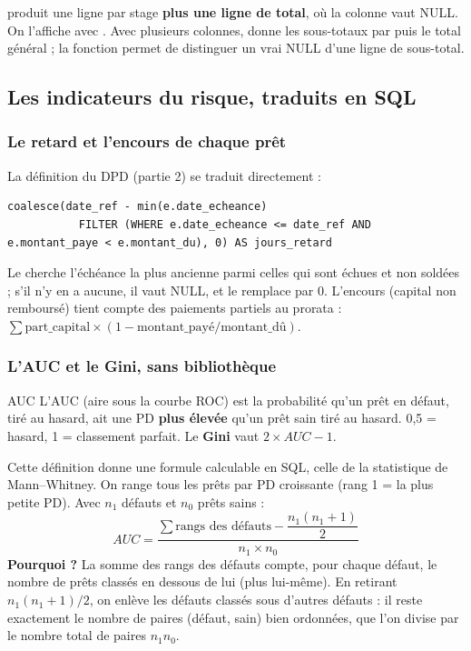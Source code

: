  produit une ligne par stage \textbf{plus une ligne de total}, où la
colonne  vaut NULL. On l'affiche avec . Avec
plusieurs colonnes,  donne les sous-totaux par  puis le total général ; la
fonction  permet de distinguer un vrai NULL d'une ligne de sous-total.

\subsection{Les indicateurs du risque, traduits en SQL}

\subsubsection{Le retard et l'encours de chaque prêt}

La définition du DPD (partie 2) se traduit directement :
\begin{lstlisting}[style=sql]
coalesce(date_ref - min(e.date_echeance)
           FILTER (WHERE e.date_echeance <= date_ref AND e.montant_paye < e.montant_du), 0) AS jours_retard
\end{lstlisting}
Le  cherche l'échéance la plus ancienne parmi celles qui sont échues et non soldées ; s'il
n'y en a aucune, il vaut NULL, et  le remplace par 0. L'encours (capital non remboursé)
tient compte des paiements partiels au prorata :
$\sum \text{part\_capital} \times (1 - \text{montant\_payé} / \text{montant\_dû})$.

\subsubsection{L'AUC et le Gini, sans bibliothèque}

\begin{definition}{AUC}
L'AUC (aire sous la courbe ROC) est la probabilité qu'un prêt en défaut, tiré au hasard, ait une PD
\textbf{plus élevée} qu'un prêt sain tiré au hasard. 0,5 = hasard, 1 = classement parfait. Le
\textbf{Gini} vaut $2 \times AUC - 1$.
\end{definition}

Cette définition donne une formule calculable en SQL, celle de la statistique de Mann--Whitney. On
range tous les prêts par PD croissante (rang 1 = la plus petite PD). Avec $n_1$ défauts et $n_0$ prêts
sains :
\[
\boxed{\;AUC = \frac{\sum \text{rangs des défauts} - \dfrac{n_1(n_1+1)}{2}}{n_1 \times n_0}\;}
\]
\textbf{Pourquoi ?} La somme des rangs des défauts compte, pour chaque défaut, le nombre de prêts
classés en dessous de lui (plus lui-même). En retirant $n_1(n_1+1)/2$, on enlève les défauts classés
sous d'autres défauts : il reste exactement le nombre de paires (défaut, sain) bien ordonnées, que l'on
divise par le nombre total de paires $n_1 n_0$.

